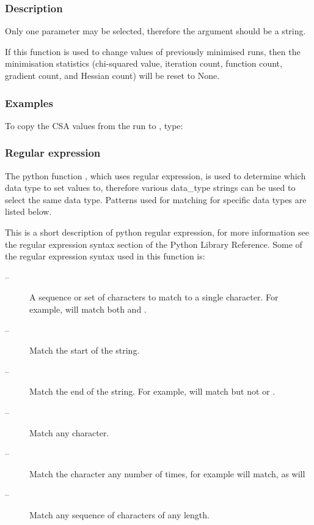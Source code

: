   
 \subsubsection{Description} 

 Only one parameter may be selected, therefore the  argument should be a string. 
  

 If this function is used to change values of previously minimised runs, then the minimisation statistics (chi-squared value, iteration count, function count, gradient count, and Hessian count) will be reset to None. 
  

  
 \subsubsection{Examples} 

 To copy the CSA values from the run  to , type: 
  


  
 \subsubsection{Regular expression} 

 The python function , which uses regular expression, is used to determine which data type to set values to, therefore various data\_type strings can be used to select the same data type.  Patterns used for matching for specific data types are listed below. 
  

 This is a short description of python regular expression, for more information see the regular expression syntax section of the Python Library Reference.  Some of the regular expression syntax used in this function is: 
  

 \begin{description} 
 \item[\quotecmd{[]} --]  A sequence or set of characters to match to a single character.  For example,  will match both  and .  
 \item[\quotecmd{\^{}} --]  Match the start of the string.  
 \item[\quotecmd{\$} --]  Match the end of the string.  For example,  will match  but not  or .  
 \item[ --]  Match any character.  
 \item[ --]  Match the character  any number of times, for example  will match, as will   
 \item[ --]  Match any sequence of characters of any length.  
 \end{description} 
  


